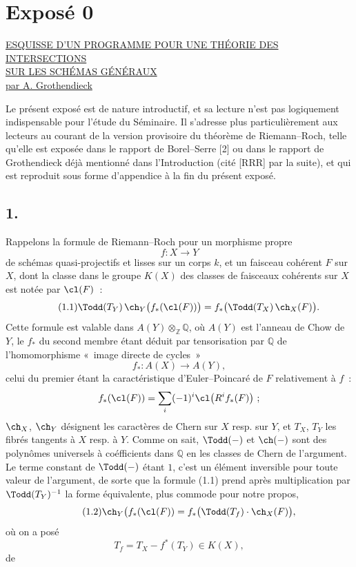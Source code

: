 \section*{Exposé 0}
\begin{center}
\underline{ESQUISSE D'UN PROGRAMME POUR UNE THÉORIE DES INTERSECTIONS}\\[3pt]
\underline{SUR LES SCHÉMAS GÉNÉRAUX}\\[8pt]
\underline{par A. Grothendieck}
\end{center}

Le présent exposé est de nature introductif, et sa lecture n'est pas logiquement indispensable pour l'étude du Séminaire. Il s'adresse plus particulièrement aux lecteurs au courant de la version provisoire du théorème de Riemann--Roch, telle qu'elle est exposée dans le rapport de Borel--Serre [2] ou dans le rapport de Grothendieck déjà mentionné dans l'Introduction (cité [RRR] par la suite), et qui est reproduit sous forme d'appendice à la fin du présent exposé.

\subsection*{1.}
Rappelons la formule de Riemann--Roch pour un morphisme propre
\[
f:X\longrightarrow Y
\]
de schémas quasi-projectifs et lisses sur un corps $k$, et un faisceau cohérent $F$ sur $X$, dont la classe dans le groupe $K(X)$ des classes de faisceaux cohérents sur $X$ est notée par $\cl(F)$~:
\begin{equation}\tag{1.1}
\Todd(T_Y)\,\ch_Y\bigl(f_*(\cl(F))\bigr)=f_*\bigl(\Todd(T_X)\,\ch_X(F)\bigr).
\end{equation}
Cette formule est valable dans $A(Y)\otimes_{\mathbb Z}\mathbb Q$, où $A(Y)$ est l'anneau de Chow de $Y$, le $f_*$ du second membre étant déduit par tensorisation par $\mathbb Q$ de l'homomorphisme «~image directe de cycles~»
\[
f_*:A(X)\longrightarrow A(Y),
\]
celui du premier étant la caractéristique d'Euler--Poincaré de $F$ relativement à $f$~:
\[
f_*(\cl(F))=\sum_i(-1)^i\cl\bigl(R^if_*(F)\bigr)~;
\]
$\ch_X$, $\ch_Y$ désignent les caractères de Chern sur $X$ resp. sur $Y$, et $T_X$, $T_Y$ les fibrés tangents à $X$ resp. à $Y$. Comme on sait, $\Todd(-)$ et $\ch(-)$ sont des polynômes universels à coéfficients dans $\mathbb Q$ en les classes de Chern de l'argument. Le terme constant de $\Todd(-)$ étant $1$, c'est un élément inversible pour toute valeur de l'argument, de sorte que la formule (1.1) prend après multiplication par $\Todd(T_Y)^{-1}$ la forme équivalente, plus commode pour notre propos,
\begin{equation}\tag{1.2}
\ch_Y\bigl(f_*(\cl(F))=f_*\bigl(\Todd(T_f)\cdot\ch_X(F)\bigr),
\end{equation}
où on a posé
\begin{equation}\tag{1.3}
T_f=T_X-f^*(T_Y)\in K(X),
\end{equation}
de
